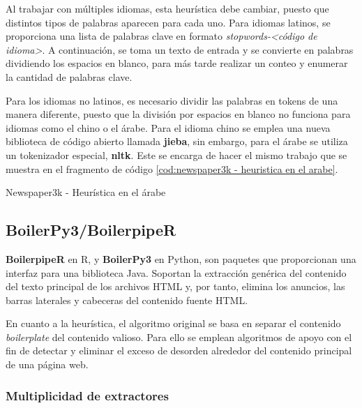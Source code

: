 Al trabajar con múltiples idiomas, esta heurística debe cambiar, puesto que distintos tipos de palabras
aparecen para cada uno. Para idiomas latinos, se proporciona una lista de palabras clave en formato 
\emph{stopwords-<código de idioma>}. A continuación, se toma un texto de entrada y se convierte en palabras 
dividiendo los espacios en blanco, para más tarde realizar un conteo y enumerar la cantidad de palabras 
clave.

Para los idiomas no latinos, es necesario dividir las palabras en tokens de una manera diferente, puesto
que la división por espacios en blanco no funciona para idiomas como el chino o el árabe. Para el idioma
chino se emplea una nueva biblioteca de código abierto llamada \textbf{jieba}, sin embargo, para el árabe
se utiliza un tokenizador especial, \textbf{nltk}. Este se encarga de hacer el mismo trabajo que se muestra 
en el fragmento de código \ref{cod:newspaper3k - heuristica en el arabe}.

\begin{codefloat}
  
  \caption{Newspaper3k - Heurística en el árabe}
  \label{cod:newspaper3k - heuristica en el arabe}
\end{codefloat}

\subsection{BoilerPy3/BoilerpipeR}
\label{subsec:boilerpy/boilerpiper}

\textbf{BoilerpipeR} \cite{boilerpipeR-cran} en R, y \textbf{BoilerPy3} \cite{boilerpy} en Python, son 
paquetes que proporcionan una interfaz para una biblioteca Java. Soportan la extracción genérica del 
contenido del texto principal de los archivos HTML y, por tanto, elimina los anuncios, las barras laterales 
y cabeceras del contenido fuente HTML.

En cuanto a la heurística, el algoritmo original se basa en separar el contenido \emph{boilerplate} del 
contenido valioso. Para ello se emplean algoritmos de apoyo con el fin de detectar y eliminar el exceso de 
desorden alrededor del contenido principal de una página web.

\subsubsection{Multiplicidad de extractores}
\label{subsubsec:multiplicidad de extractores}

